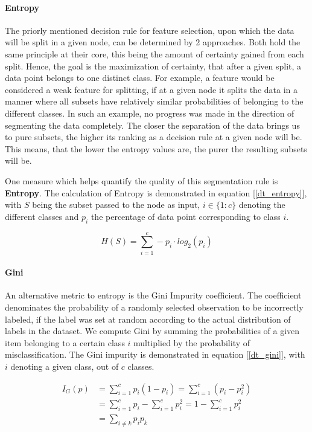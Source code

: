 	\paragraph{Entropy}
		The priorly mentioned decision rule for feature selection, upon which the data will be split in a given node, can be determined by 2 approaches. Both hold the same principle at their core, this being the amount of certainty gained from each split. Hence, the goal is the maximization of certainty, that after a given split, a data point belongs to one distinct class. For example, a feature would be considered a weak feature for splitting, if at a given node it splits the data in a manner where all subsets have relatively similar probabilities of belonging to the different classes. In such an example, no progress was made in the direction of segmenting the data completely. The closer the separation of the data brings us to pure subsets, the higher its ranking as a decision rule at a given node will be. This means, that the lower the entropy values are, the purer the resulting subsets will be.
		
		\par
		One measure which helps quantify the quality of this segmentation rule is \textbf{Entropy}. The calculation of Entropy is demonstrated in equation [\ref{dt_entropy}], with $ S $ being the subset passed to the node as input, $ i \in \{1:c \} $ denoting the different classes and $ p_i $ the percentage of data point corresponding to class $ i $. 
		
		\begin{equation}
			H(S) = \sum_{i=1}^c - p_i \cdot log_2 (p_i)
			\label{dt_entropy}
		\end{equation}
		
	 \paragraph{Gini}
	 	An alternative metric to entropy is the Gini Impurity coefficient. The coefficient denominates the probability of a randomly selected observation to be incorrectly labeled, if the label was set at random according to the actual distribution of labels in the dataset. We compute Gini by summing the probabilities of a given item belonging to a certain class $ i $ multiplied by the probability of misclassification. The Gini impurity is demonstrated in equation [\ref{dt_gini}], with $ i $ denoting a given class, out of $ c $ classes.
	 	
	 \begin{equation}
	 	\begin{aligned}
		 	I_G(p) &= \sum_{i=1}^c p_i(1-p_i) = \sum_{i=1}^c (p_i-p_i^2) \\  &=\sum_{i=1}^c p_i - \sum_{i=1}^c p_i^2 = 1 - \sum_{i=1}^c p_i^2 \\ &= \sum_{i \neq k} p_i p_k
	 	\end{aligned}
		\label{dt_gini}
	 \end{equation}
	 
